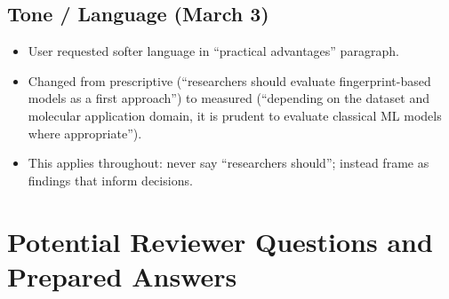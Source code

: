 \documentclass[11pt,a4paper]{article}
\begin{document}
\subsection{Tone / Language (March 3)}
\begin{itemize}
    \item User requested softer language in ``practical advantages'' paragraph.
    \item Changed from prescriptive (``researchers should evaluate fingerprint-based models as a first approach'') to measured (``depending on the dataset and molecular application domain, it is prudent to evaluate classical ML models where appropriate'').
    \item This applies throughout: never say ``researchers should''; instead frame as findings that inform decisions.
\end{itemize}


\section{Potential Reviewer Questions and Prepared Answers}
\end{document}
